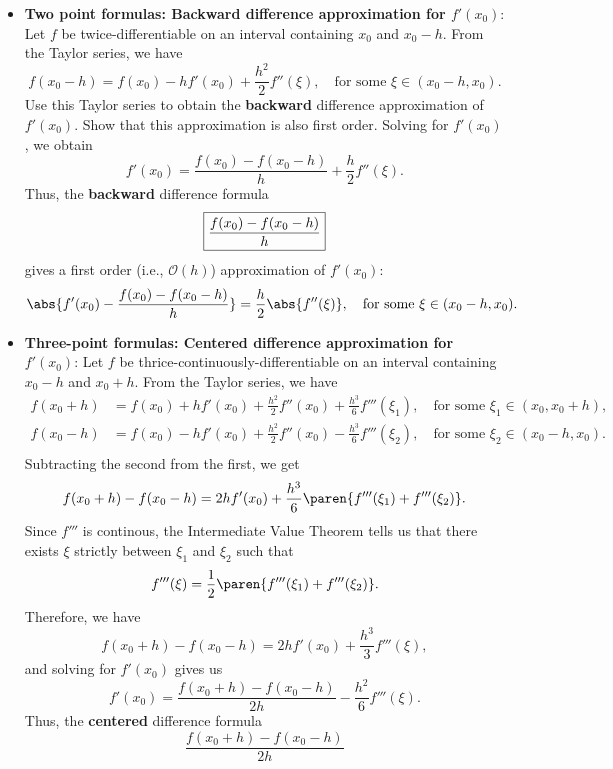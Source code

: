 \documentclass{report}
\begin{document}
\begin{itemize}
        \item \textbf{Two point formulas: Backward difference approximation for $f'(x_0)$}: 
            Let $f$ be twice-differentiable on an interval containing $x_0$ and $x_0-h$. From the Taylor series, we have
            $$f(x_0 - h) = f(x_0) - hf'(x_0) + \frac{h^2}{2}f''(\xi), \quad \text{for some $\xi \in (x_0-h,x_0).$}$$
            Use this Taylor series to obtain the \textbf{backward} difference approximation of $f'(x_0)$. Show that this approximation is also first order.
            \bigbreak \noindent 
            Solving for $f'(x_0)$, we obtain
            $$f'(x_0) = \frac{f(x_0) - f(x_0-h)}{h} + \frac{h}{2}f''(\xi).$$
            Thus, the \textbf{backward} difference formula 
            $$\fbox{${\displaystyle\frac{f(x_0) - f(x_0-h)}{h}}$}$$
            gives a first order (i.e., $\mathcal{O}(h)$) approximation of $f'(x_0)$:
            $$\abs{f'(x_0) - \frac{f(x_0) - f(x_0-h)}{h}} = \frac{h}{2}\abs{f''(\xi)}, \quad \text{for some $\xi \in (x_0-h,x_0).$}$$
        \item \textbf{Three-point formulas: Centered difference approximation for $f'(x_0)$}:
            Let $f$ be thrice-continuously-differentiable on an interval containing $x_0-h$ and $x_0+h$. From the Taylor series, we have
            \begin{align*}
                f(x_0 + h) &= f(x_0) + hf'(x_0) + \frac{h^2}{2}f''(x_0) + \frac{h^3}{6}f'''(\xi_1), \quad \text{for some $\xi_1 \in (x_0,x_0+h),$} \\
                f(x_0 - h) &= f(x_0) - hf'(x_0) + \frac{h^2}{2}f''(x_0) - \frac{h^3}{6}f'''(\xi_2), \quad \text{for some $\xi_2 \in (x_0-h,x_0).$}\\
            \end{align*}
            Subtracting the second from the first, we get
            $$f(x_0 + h) - f(x_0 - h) = 2hf'(x_0) + \frac{h^3}{6}\paren{f'''(\xi_1) + f'''(\xi_2)}.$$
            \bigbreak \noindent 
            Since $f'''$ is continous, the Intermediate Value Theorem tells us that there exists $\xi$ strictly between $\xi_1$ and $\xi_2$ such that
            $$f'''(\xi) = \frac{1}{2}\paren{f'''(\xi_1) + f'''(\xi_2)}.$$
            Therefore, we have
            $$f(x_0 + h) - f(x_0 - h) = 2hf'(x_0) + \frac{h^3}{3}f'''(\xi),$$
            and solving for $f'(x_0)$ gives us
            $$f'(x_0) = \frac{f(x_0 + h) - f(x_0 - h)}{2h} - \frac{h^2}{6}f'''(\xi).$$
            \bigbreak \noindent 
            Thus, the \textbf{centered} difference formula
            $$\displaystyle \frac{f(x_0 + h) - f(x_0 - h)}{2h}$$

\end{itemize}
\end{document}

